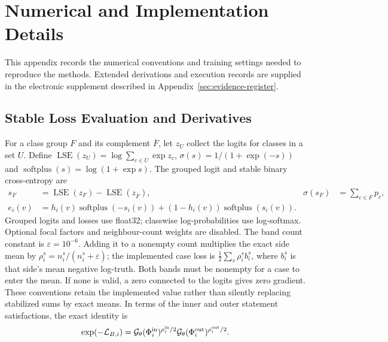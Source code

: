 \section{Numerical and Implementation Details}
\label{sec:technical-details}

This appendix records the numerical conventions and training settings
needed to reproduce the methods. Extended derivations and execution
records are supplied in the electronic supplement described in
Appendix~\ref{sec:evidence-register}.

\subsection{Stable Loss Evaluation and Derivatives}
\label{sec:band-implementation-details}

For a class group $F$ and its complement $\overline F$, let $z_U$
collect the logits for classes in a set $U$. Define
$\operatorname{LSE}(z_U)=\log\sum_{c\in U}\exp z_c$,
$\sigma(s)=1/(1+\exp(-s))$ and
$\operatorname{softplus}(s)=\log(1+\exp s)$. The grouped logit and
stable binary cross-entropy are
\begin{align}
s_F&=\operatorname{LSE}(z_F)-\operatorname{LSE}(z_{\overline F}),
 &\sigma(s_F)&=\sum_{c\in F}p_c,\label{eq:grouped-predicate-logit}\\
e_i(v)&=h_i(v)\operatorname{softplus}(-s_i(v))
 +(1-h_i(v))\operatorname{softplus}(s_i(v)).&&\label{eq:band-stable-bce}
\end{align}
Grouped logits and losses use float32; classwise log-probabilities use
log-softmax. Optional focal factors and neighbour-count weights are
disabled. The band count constant is $\varepsilon=10^{-6}$. Adding it
to a nonempty count multiplies the exact side mean by
$\rho_i^s=n_i^s/(n_i^s+\varepsilon)$; the implemented case loss is
$\tfrac12\sum_s\rho_i^s b_i^s$, where $b_i^s$ is that side's mean
negative log-truth. Both bands must be nonempty for a case to enter the
mean. If none is valid, a zero connected to the logits gives zero
gradient. These conventions retain the implemented value rather than
silently replacing stabilized sums by exact means.
In terms of the inner and outer statement satisfactions, the exact
identity is
\begin{equation}
\exp(-\mathcal L_{B,i})=
\mathcal G_\theta(\Phi_i^{\rm in})^{\rho_i^{\rm in}/2}
\mathcal G_\theta(\Phi_i^{\rm out})^{\rho_i^{\rm out}/2}.
\label{eq:balanced-band-satisfaction}
\end{equation}

